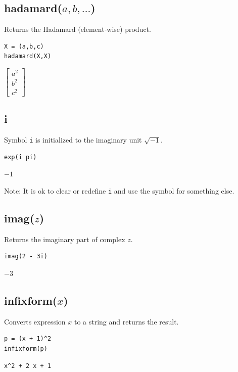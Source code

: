 \documentclass[12pt]{article}
\begin{document}
\subsection*{hadamard($a,b,\ldots$)}

Returns the Hadamard (element-wise) product.

{\color{blue}
\begin{verbatim}
X = (a,b,c)
hadamard(X,X)
\end{verbatim}
}

$\displaystyle
\begin{bmatrix}
a^2
\\[1ex]
b^2
\\[1ex]
c^2
\end{bmatrix}
$

\subsection*{i}

Symbol {\tt i} is initialized to the imaginary unit $\sqrt{-1}$.

{\color{blue}
\begin{verbatim}
exp(i pi)
\end{verbatim}
}

$-1$

\bigskip
Note: It is ok to clear or redefine {\tt i} and use the symbol for something else.

\subsection*{imag($z$)}

Returns the imaginary part of complex $z$.

{\color{blue}
\begin{verbatim}
imag(2 - 3i)
\end{verbatim}
}

$-3$

\subsection*{infixform($x$)}

Converts expression $x$ to a string and returns the result.

{\color{blue}
\begin{verbatim}
p = (x + 1)^2
infixform(p)
\end{verbatim}
}

\verb$x^2 + 2 x + 1$
\end{document}
